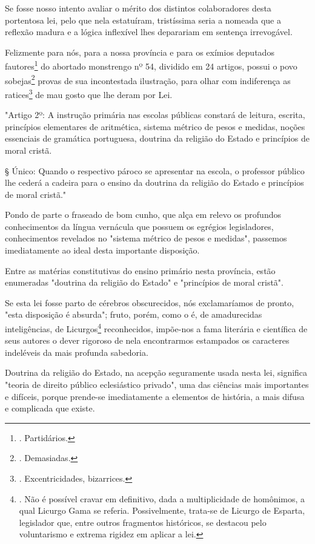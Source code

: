 Se fosse nosso intento avaliar o mérito dos distintos colaboradores
desta portentosa lei, pelo que nela estatuíram, tristíssima seria a
nomeada que a reflexão madura e a lógica inflexível lhes deparariam em
sentença irrevogável.

Felizmente para nós, para a nossa província e para os exímios deputados
fautores\footnote{. Partidários.} do abortado monstrengo nº 54, dividido
em 24 artigos, possui o povo sobejas\footnote{. Demasiadas.} provas de
sua incontestada ilustração, para olhar com indiferença as
ratices\footnote{. Excentricidades, bizarrices.} de mau gosto que lhe
deram por Lei.

"Artigo 2º: A instrução primária nas escolas públicas constará de
leitura, escrita, princípios elementares de aritmética, sistema métrico
de pesos e medidas, noções essenciais de gramática portuguesa, doutrina
da religião do Estado e princípios de moral cristã.

§ Único: Quando o respectivo pároco se apresentar na escola, o professor
público lhe cederá a cadeira para o ensino da doutrina da religião do
Estado e princípios de moral cristã."

Pondo de parte o fraseado de bom cunho, que alça em relevo os profundos
conhecimentos da língua vernácula que possuem os egrégios legisladores,
conhecimentos revelados no "sistema métrico de pesos e medidas",
passemos imediatamente ao ideal desta importante disposição.

Entre as matérias constitutivas do ensino primário nesta província,
estão enumeradas "doutrina da religião do Estado" e "princípios de moral
cristã".

Se esta lei fosse parto de cérebros obscurecidos, nós exclamaríamos de
pronto, "esta disposição é absurda"; fruto, porém, como o é, de
amadurecidas inteligências, de Licurgos\footnote{. Não é possível cravar
  em definitivo, dada a multiplicidade de homônimos, a qual Licurgo Gama
  se referia. Possivelmente, trata-se de Licurgo de Esparta, legislador
  que, entre outros fragmentos históricos, se destacou pelo voluntarismo
  e extrema rigidez em aplicar a lei.} reconhecidos, impõe-nos a fama
literária e científica de seus autores o dever rigoroso de nela
encontrarmos estampados os caracteres indeléveis da mais profunda
sabedoria.

Doutrina da religião do Estado, na acepção seguramente usada nesta lei,
significa "teoria de direito público eclesiástico privado", uma das
ciências mais importantes e difíceis, porque prende-se imediatamente a
elementos de história, a mais difusa e complicada que existe.

